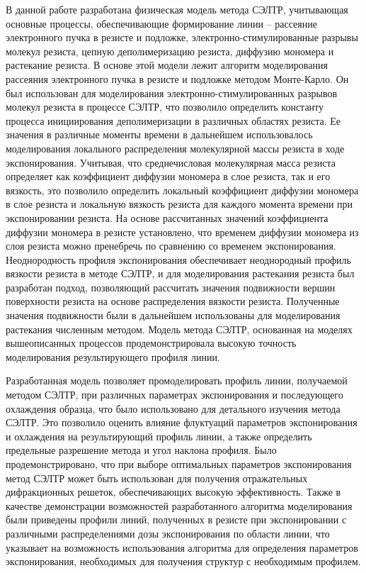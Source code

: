 В данной работе разработана физическая модель метода СЭЛТР, учитывающая основные процессы, обеспечивающие формирование линии -- рассеяние электронного пучка в резисте и подложке, электронно-стимулированные разрывы молекул резиста, цепную деполимеризацию резиста, диффузию мономера и растекание резиста. В основе этой модели лежит алгоритм моделирования рассеяния электронного пучка в резисте и подложке методом Монте-Карло. Он был использован для моделирования электронно-стимулированных разрывов молекул резиста в процессе СЭЛТР, что позволило определить константу процесса инициирования деполимеризации в различных областях резиста. Ее значения в различные моменты времени в дальнейшем использовалось моделирования локального распределения молекулярной массы резиста в ходе экспонирования. Учитывая, что среднечисловая молекулярная масса резиста определяет как коэффициент диффузии мономера в слое резиста, так и его вязкость, это позволило определить локальный коэффициент диффузии мономера в слое резиста и локальную вязкость резиста для каждого момента времени при экспонировании резиста. На основе рассчитанных значений коэффициента диффузии мономера в резисте установлено, что временем диффузии мономера из слоя резиста можно пренебречь по сравнению со временем экспонирования. Неоднородность профиля экспонирования обеспечивает неоднородный профиль вязкости резиста в методе СЭЛТР, и для моделирования растекания резиста был разработан подход, позволяющий рассчитать значения подвижности вершин поверхности резиста на основе распределения вязкости резиста. Полученные значения подвижности были в дальнейшем использованы для моделирования растекания численным методом. Модель метода СЭЛТР, основанная на моделях вышеописанных процессов продемонстрировала высокую точность моделирования результирующего профиля линии.

Разработанная модель позволяет промоделировать профиль линии, получаемой методом СЭЛТР, при различных параметрах экспонирования и последующего охлаждения образца, что было использовано для детального изучения метода СЭЛТР.
Это позволило оценить влияние флуктуаций параметров экспонирования и охлаждения на результирующий профиль линии, а также определить предельные разрешение метода и угол наклона профиля. Было продемонстрировано, что при выборе оптимальных параметров экспонирования метод СЭЛТР может быть использован для получения отражательных дифракционных решеток, обеспечивающих высокую эффективность. Также в качестве демонстрации возможностей разработанного алгоритма моделирования были приведены профили линий, полученных в резисте при экспонировании с различными распределениями дозы экспонирования по области линии, что указывает на возможность использования алгоритма для определения параметров экспонирования, необходимых для получения структур с необходимым профилем.
